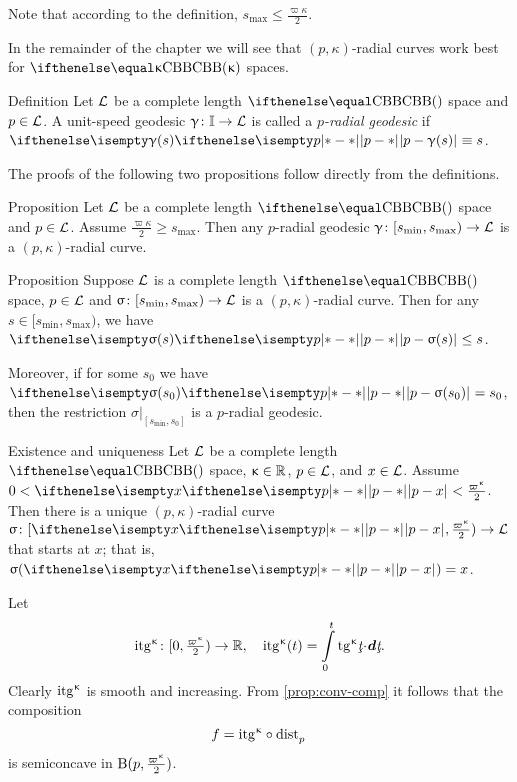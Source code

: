 Note that according to the definition, $s_{\max}\le\tfrac{\varpi\kappa}2$.

In the remainder of the chapter we will see that  $(p,\kappa)$-radial curves 
work best for $\Alex\kappa$ spaces.



\begin{thm}{Definition}\label{def:rad-geod}
Let $\mathcal{L}$ be a complete length $\Alex{}$ space
and $p\in\spc{L}$.
A unit-speed geodesic  $\gamma\:\II\to \spc{L}$  is called a
\emph{$p$-radial geodesic} if 
$\dist{p}{\gamma(s)}{}\equiv s$.
\end{thm}

The proofs of the following two propositions follow directly from the definitions. 

\begin{thm}{Proposition}\label{prop:rad-geod}
Let $\mathcal{L}$ be a complete length $\Alex{}$ space
and $p\in\spc{L}$.
Assume $\tfrac{\varpi\kappa}{2}
\ge 
s_{\max}$.
Then any $p$-radial geodesic 
$\gamma\:[s_{\min},s_{\max})
\to 
\spc{L}$ 
is a $(p,\kappa)$-radial curve.
\end{thm}

\begin{thm}{Proposition}\label{prop:dist<s}
Suppose $\mathcal{L}$ is a complete length $\Alex{}$ space, 
$p\in\spc{L}$ 
and $\sigma\:[s_{\min},s_{\max})\to \spc{L}$ is a $(p,\kappa)$-radial curve.
Then for any $s\in [s_{\min},s_{\max})$, 
we have $\dist{p}{\sigma(s)}{}\le s$.

Moreover, 
if for some $s_0$ we have $\dist{p}{\sigma(s_0)}{}= s_0$, 
then the restriction $\sigma|_{[s_{\min},s_0]}$ is a $p$-radial geodesic.
\end{thm}

\begin{thm}{Existence and uniqueness}\label{rad-curv-exist}
Let $\mathcal{L}$ be a complete length $\Alex{}$ space, 
$\kappa\in\RR$, 
$p\in\spc{L}$, 
and $x\in \spc{L}$.
Assume
$0
<
\dist{p}{x}{}
<
\tfrac{\varpi\kappa}2$.
Then there is a unique $(p,\kappa)$-radial curve $\sigma\:[\dist{p}{x}{},\tfrac{\varpi\kappa}2)\to \spc{L}$ 
that starts at $x$;
that is, $\sigma(\dist{p}{x}{})=x$.
\end{thm}


Let \index{$\itg\kappa$} 
\[\itg\kappa\:[0,\tfrac{\varpi\kappa}2)\to\RR,
\quad 
\itg\kappa (t)=\int\limits_0^t\tg\kappa\under t\cdot\dd\under t.\]
Clearly $\itg\kappa$ is smooth and increasing.
From \ref{prop:conv-comp} it follows that the composition 
\[f=\itg\kappa\circ\distfun{p}{}{}\] 
is semiconcave in $\oBall(p,\tfrac{\varpi\kappa}2)$.

